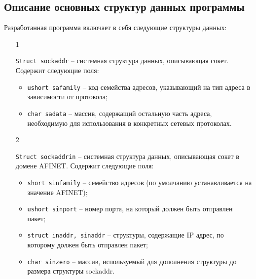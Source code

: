 \subsection{Описание основных структур данных программы}

Разработанная программа включает в себя следующие структуры данных:
\begin{enumerate}
    \item[1] {{\texttt{Struct sockaddr}} -- системная структура данных, описывающая сокет.
    Содержит следующие поля:
        \begin{itemize}
            \item \texttt{u{\textunderscore}short sa{\textunderscore}family} -- код семейства адресов, указывающий на тип
            адреса в зависимости от протокола;
            \item \texttt{char sa{\textunderscore}data} -- массив, содержащий остальную часть адреса,
            необходимую для использования в конкретных сетевых протоколах.
        \end{itemize}}

    \item[2] {{\texttt{Struct sockaddr{\textunderscore}in}} -- системная структура данных, описывающая сокет
    в домене AF{\textunderscore}INET. Содержит следующие поля:
        \begin{itemize}
            \item \texttt{short sin{\textunderscore}family} -- семейство адресов (по умолчанию
            устанавливается на значение AF{\textunderscore}INET);
            \item \texttt{u{\textunderscore}short sin{\textunderscore}port} -- номер порта, на который должен быть
            отправлен пакет;
            \item \texttt{struct in{\textunderscore}addr, sin{\textunderscore}addr} -- структуры, содержащие IP адрес, по
            которому должен быть отправлен пакет;
            \item \texttt{char sin{\textunderscore}zero} -- массив, используемый для дополнения структуры
            до размера структуры sockaddr.
        \end{itemize}}


\end{enumerate}
